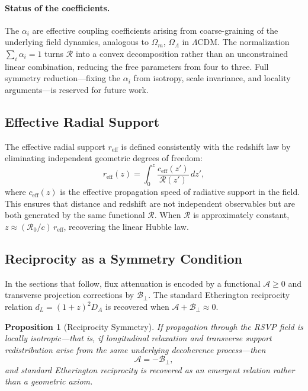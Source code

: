 \documentclass[12pt,a4paper]{article}
\newtheorem{proposition}[theorem]{Proposition}
\theoremstyle{remark}
\newcommand{\Rcal}{\mathcal{R}}
\newcommand{\Acal}{\mathcal{A}}
\newcommand{\Bcal}{\mathcal{B}}
\newcommand{\reff}{r_{\mathrm{eff}}}
\newcommand{\ceff}{c_{\mathrm{eff}}}
\begin{document}
\paragraph{Status of the coefficients.} The $\alpha_i$ are effective coupling coefficients arising from coarse-graining of the underlying field dynamics, analogous to $\Omega_m$, $\Omega_\Lambda$ in $\Lambda$CDM. The normalization $\sum_i \alpha_i = 1$ turns $\Rcal$ into a convex decomposition rather than an unconstrained linear combination, reducing the free parameters from four to three. Full symmetry reduction---fixing the $\alpha_i$ from isotropy, scale invariance, and locality arguments---is reserved for future work.

\subsection{Effective Radial Support}

The effective radial support $\reff$ is defined consistently with the redshift law by eliminating independent geometric degrees of freedom:
\begin{equation}
\boxed{r_{\mathrm{eff}}(z) = \int_0^z \frac{\ceff(z')}{\Rcal(z')}\, dz',}
\label{eq:reff}
\end{equation}
where $\ceff(z)$ is the effective propagation speed of radiative support in the field. This ensures that distance and redshift are not independent observables but are both generated by the same functional $\Rcal$. When $\Rcal$ is approximately constant, $z \approx (\Rcal_0/c)\,\reff$, recovering the linear Hubble law.

\subsection{Reciprocity as a Symmetry Condition}

In the sections that follow, flux attenuation is encoded by a functional $\Acal \ge 0$ and transverse projection corrections by $\Bcal_\perp$. The standard Etherington reciprocity relation $d_L = (1+z)^2 D_A$ is recovered when $\Acal + \Bcal_\perp \approx 0$.

\begin{proposition}[Reciprocity Symmetry]
If propagation through the RSVP field is locally isotropic---that is, if longitudinal relaxation and transverse support redistribution arise from the same underlying decoherence process---then
\begin{equation}
\Acal = -\Bcal_\perp,
\label{eq:reciprocity}
\end{equation}
and standard Etherington reciprocity is recovered as an emergent relation rather than a geometric axiom.
\end{proposition}
\end{document}
